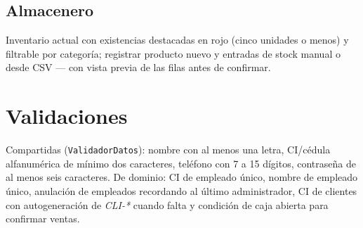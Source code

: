 \subsection{Almacenero}

Inventario actual con existencias destacadas en rojo (cinco unidades o menos) y filtrable por categoría; registrar producto nuevo y entradas de stock manual o desde CSV — con vista previa de las filas antes de confirmar.

\section{Validaciones}
Compartidas (\texttt{ValidadorDatos}): nombre con al menos una letra, CI/cédula alfanumérica de mínimo dos caracteres, teléfono con 7 a 15 dígitos, contraseña de al menos seis caracteres. De dominio: CI de empleado único, nombre de empleado único, anulación de empleados recordando al último administrador, CI de clientes con autogeneración de \emph{CLI-*} cuando falta y condición de caja abierta para confirmar ventas.
